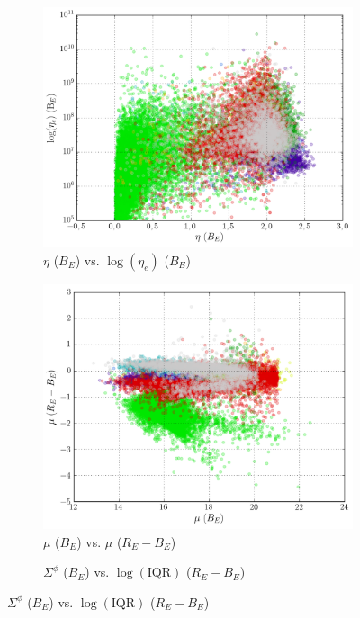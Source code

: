 \begin{figure}[H]
\begin{subfigure}[t]{0.49\textwidth}
		\centering
		\caption{$\eta$ ($B_E$) vs. $\log(\eta_e)$ ($B_E$)}
		\label{fig:2c}
		\includegraphics[width=\textwidth]{figures/scatterplots/B-eta-B-eta-e.png}
	\end{subfigure}
	\begin{subfigure}[t]{0.49\textwidth}
		\centering
		\caption{$\mu$ ($B_E$) vs. $\mu$ ($R_E - B_E$)}
		\label{fig:2d}
		\includegraphics[width=\textwidth]{figures/scatterplots/B-mean-R-B-mean.png}
	\end{subfigure}
	\begin{subfigure}[t]{0.49\textwidth}
		\centering
		\caption{$\Sigma^\phi$ ($B_E$) vs. $\log(\text{IQR})$ ($R_E - B_E$)}

\end{subfigure}
\end{figure}
